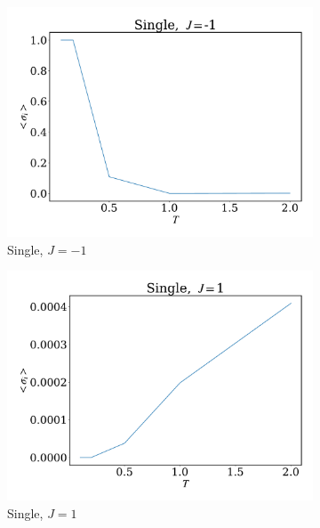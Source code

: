 \documentclass[12pt]{article}
\begin{document}
\begin{figure}
	\centering
	\begin{subfigure}[b]{0.49\textwidth}
		\centering
		\includegraphics[width=\textwidth]{fig1DJ1N1e7/ave_sJ-1.pdf}
		\caption{Single, $J=-1$}
	\end{subfigure}
	\hfill
	\begin{subfigure}[b]{0.49\textwidth}
		\centering
		\includegraphics[width=\textwidth]{fig1DJ1N1e7/ave_sJ1.pdf}
		\caption{Single, $J=1$}
	\end{subfigure}
	\hfill
	\begin{subfigure}[b]{0.49\textwidth}
		\centering

\end{subfigure}
\end{figure}
\end{document}
